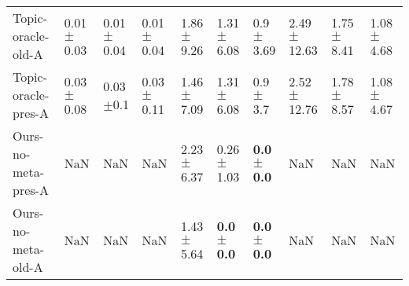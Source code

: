 \begin{tabular}{llllllllll}
Topic-oracle-old-A  &  0.01$\pm$0.03 &  0.01$\pm$0.04 &  0.01$\pm$0.04 &           1.86$\pm$9.26 &         1.31$\pm$6.08 &          0.9$\pm$3.69 &  2.49$\pm$12.63 &  1.75$\pm$8.41 &   1.08$\pm$4.68 \\
Topic-oracle-pres-A &  0.03$\pm$0.08 &   0.03$\pm$0.1 &  0.03$\pm$0.11 &           1.46$\pm$7.09 &         1.31$\pm$6.08 &           0.9$\pm$3.7 &  2.52$\pm$12.76 &  1.78$\pm$8.57 &   1.08$\pm$4.67 \\
Ours-no-meta-pres-A &            NaN &            NaN &            NaN &           2.23$\pm$6.37 &         0.26$\pm$1.03 &  \textbf{0.0$\pm$0.0} &             NaN &            NaN &             NaN \\
Ours-no-meta-old-A  &            NaN &            NaN &            NaN &           1.43$\pm$5.64 &  \textbf{0.0$\pm$0.0} &  \textbf{0.0$\pm$0.0} &             NaN &            NaN &             NaN \\
\bottomrule
\end{tabular}
